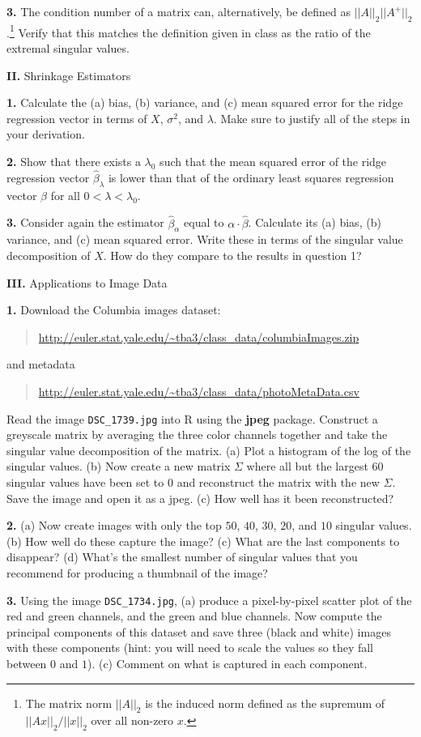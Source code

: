 \documentclass[12pt]{article}
\begin{document}
{\bf 3.} The condition number of a matrix can, alternatively, be defined as
$|| A ||_2 || A^{+} ||_2$.\footnote{The matrix norm $||A||_2$ is the induced
norm defined as the supremum  of $||Ax||_2 / ||x||_2$ over all non-zero $x$.}
Verify that this matches the definition given in class as the
ratio of the extremal singular values.

{\bf II.} Shrinkage Estimators

{\bf 1.} Calculate the (a) bias, (b) variance, and (c) mean squared error for the ridge
regression vector in terms of $X$, $\sigma^2$, and $\lambda$. Make sure to justify all
of the steps in your derivation.

{\bf 2.} Show that there exists a $\lambda_0$ such that the mean squared error of the
ridge regression vector $\widehat{\beta}_\lambda$ is lower than that of the ordinary least squares
regression vector $\widehat{\beta}$ for all $0 < \lambda < \lambda_0$.

{\bf 3.} Consider again the estimator $\widehat{\beta}_\alpha$ equal to $\alpha \cdot \widehat{\beta}$.
Calculate its (a) bias, (b) variance, and (c) mean squared error. Write these in terms of the
singular value decomposition of $X$. How do they compare to the results in question 1?

{\bf III.} Applications to Image Data

{\bf 1.} Download the Columbia images dataset:
\begin{quote}
\url{http://euler.stat.yale.edu/~tba3/class_data/columbiaImages.zip}
\end{quote}
and metadata
\begin{quote}
\url{http://euler.stat.yale.edu/~tba3/class_data/photoMetaData.csv}
\end{quote}
Read the image \texttt{DSC\_1739.jpg} into R using
the \textbf{jpeg} package. Construct a greyscale matrix by averaging the three color
channels together and take the singular value decomposition of the matrix.
(a) Plot a histogram of the log of the
singular values. (b) Now create a new matrix $\Sigma$ where all but the largest $60$ singular values
have been set to $0$ and reconstruct the matrix with the new $\Sigma$. Save the image and open it
as a jpeg. (c) How well has it been reconstructed?

{\bf 2.} (a) Now create images with only the top $50$, $40$, $30$, $20$, and $10$ singular values.
(b) How well do these capture the image? (c) What are the last components to
disappear? (d) What's the smallest number of singular values that you recommend for producing
a thumbnail of the image?

{\bf 3.} Using the image \texttt{DSC\_1734.jpg}, (a) produce a pixel-by-pixel scatter
plot of the red and green channels, and the green and blue channels.
Now compute the principal components of this dataset and save three (black and white)
images with these components (hint: you will need to scale the values so they fall
between $0$ and $1$). (c) Comment on what is captured in each component.
\end{document}
